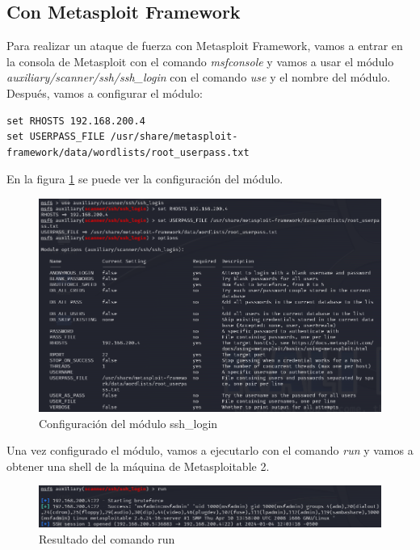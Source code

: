 \documentclass[11pt]{report}
\begin{document}
\subsection{Con Metasploit Framework}
Para realizar un ataque de fuerza con Metasploit Framework, vamos a entrar en la consola de Metasploit con el comando \emph{msfconsole} y vamos a usar el módulo \emph{auxiliary/scanner/ssh/ssh\_login} con el comando \emph{use} y el nombre del módulo.
Después, vamos a configurar el módulo:
\begin{verbatim}
set RHOSTS 192.168.200.4
set USERPASS_FILE /usr/share/metasploit-framework/data/wordlists/root_userpass.txt
\end{verbatim}

En la figura \ref{fig:Configuración del módulo ssh_login} se puede ver la configuración del módulo.

\begin{figure}[H]
  \centering
  \includegraphics[scale=0.6]{img/ssh_msf.png}
  \caption{Configuración del módulo ssh\_login}
  \label{fig:Configuración del módulo ssh_login}
\end{figure}

Una vez configurado el módulo, vamos a ejecutarlo con el comando \emph{run} y vamos a obtener una shell de la máquina de Metasploitable 2.
\begin{figure}[H]
  \centering
  \includegraphics[scale=0.6]{img/ssh_msf_result.png}
  \caption{Resultado del comando run}
\end{figure}
\end{document}
